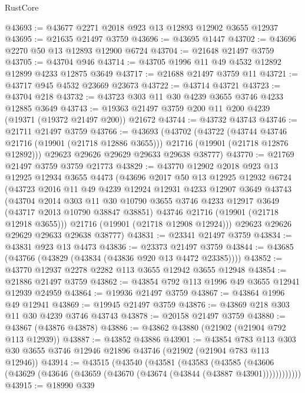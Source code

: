 \begin{lexlean}{RustCore}
\begin{coremodule}
@43693 := @43677 @2271 @2018 @923 @13 @12893 @12902 @3655 @12937
@43695 := @21635 @21497 @3759
@43696 := @43695 @1447
@43702 := @43696 @2270 @50 @13 @12893 @12900 @6724
@43704 := @21648 @21497 @3759
@43705 := @43704 @946
@43714 := @43705 @1996 @11 @49 @4532 @12892 @12899 @4233 @12875 @3649
@43717 := @21688 @21497 @3759 @11
@43721 := @43717 @945 @4532 @23669 @23673
@43722 := @43714 @43721
@43723 := @43704 @218
@43732 := @43723 @303 @11 @30 @4239 @3655 @3746 @4233 @12885 @3649
@43743 := @19363 @21497 @3759 @200 @11 @200 @4239 (@19371 (@19372 @21497 @200)) @21672
@43744 := @43732 @43743
@43746 := @21711 @21497 @3759
@43766 := @43693
    (@43702
      (@43722
        (@43744 @43746 @21716 (@19901 (@21718 @12886 @3655)))
        @21716
        (@19901 (@21718 @12876 @12892)))
      @29623
      @29626
      @29629
      @29633
      @29638
      @38777)
@43770 := @21769 @21497 @3759 @3759 @21773
@43829 := @43770
    @12902
    @2018
    @923
    @13
    @12925
    @12934
    @3655
    @4473
    (@43696
      @2017
      @50
      @13
      @12925
      @12932
      @6724
      (@43723
        @2016
        @11
        @49
        @4239
        @12924
        @12931
        @4233
        @12907
        @3649
        @43743
        (@43704
          @2014
          @303
          @11
          @30
          @10790
          @3655
          @3746
          @4233
          @12917
          @3649
          (@43717 @2013 @10790 @38847 @38851)
          @43746
          @21716
          (@19901 (@21718 @12918 @3655)))
        @21716
        (@19901 (@21718 @12908 @12924)))
      @29623
      @29626
      @29629
      @29633
      @29638
      @38777)
@43831 := @23341 @21497 @3759
@43834 := @43831 @923 @13 @4473
@43836 := @23373 @21497 @3759
@43844 := @43685 (@43766 (@43829 (@43834 (@43836 @920 @13 @4472 @23385))))
@43852 := @43770 @12937 @2278 @2282 @113 @3655 @12942 @3655 @12948
@43854 := @21886 @21497 @3759
@43862 := @43854 @792 @113 @1996 @49 @3655 @12941 @12939 @24959
@43864 := @19936 @21497 @3759
@43867 := @43864 @1996 @49 @12941
@43869 := @19945 @21497 @3759
@43876 := @43869 @218 @303 @11 @30 @4239 @3746 @43743
@43878 := @20158 @21497 @3759
@43880 := @43867 (@43876 @43878)
@43886 := @43862 @43880 (@21902 (@21904 @792 @113 @12939))
@43887 := @43852 @43886
@43901 := @43854
    @783
    @113
    @303
    @30
    @3655
    @3746
    @12946
    @21896
    @43746
    (@21902 (@21904 @783 @113 @12946))
@43914 := @43515
    (@43540
      (@43581
        (@43583
          (@43585 (@43606 (@43629 (@43646 (@43659 (@43670 (@43674 (@43844 (@43887 @43901))))))))))))
@43915 := @18990 @339

\end{coremodule}
\end{lexlean}

